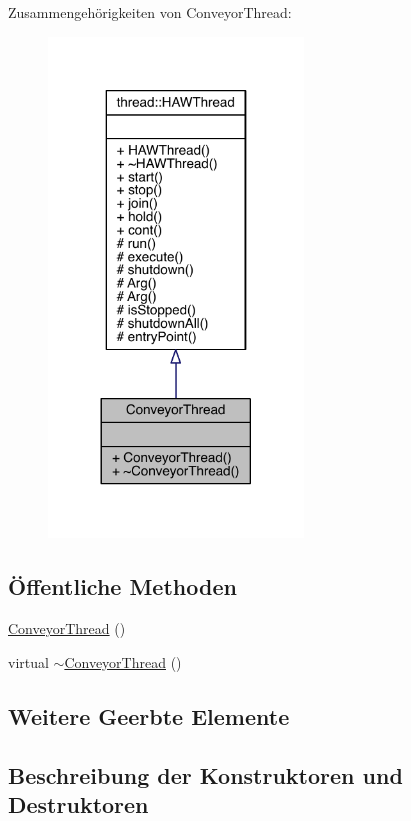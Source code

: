 Zusammengehörigkeiten von Conveyor\+Thread\+:\nopagebreak
\begin{figure}[H]
\begin{center}
\leavevmode
\includegraphics[width=192pt]{class_conveyor_thread__coll__graph}
\end{center}
\end{figure}
\subsection*{Öffentliche Methoden}
\begin{DoxyCompactItemize}
\item 
\hyperlink{class_conveyor_thread_a2068e0741d46acdd2738d65447b594b6}{Conveyor\+Thread} ()
\item 
virtual \hyperlink{class_conveyor_thread_ac496ae2a4708c7cd3af20721c1bf8b8a}{$\sim$\+Conveyor\+Thread} ()
\end{DoxyCompactItemize}
\subsection*{Weitere Geerbte Elemente}


\subsection{Beschreibung der Konstruktoren und Destruktoren}
\hypertarget{class_conveyor_thread_a2068e0741d46acdd2738d65447b594b6}{}\label{class_conveyor_thread_a2068e0741d46acdd2738d65447b594b6} 
